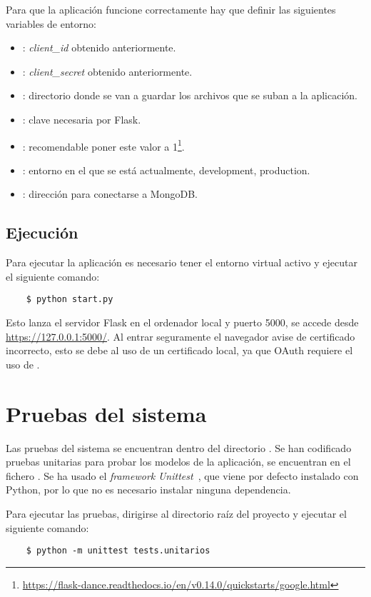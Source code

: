 Para que la aplicación funcione correctamente hay que definir las siguientes 
variables de entorno:
\begin{itemize}
	\item {}: \textit{client\_id} obtenido 
	anteriormente.
	\item {}: \textit{client\_secret} 
	obtenido anteriormente.
	\item {}: directorio donde se van a guardar los archivos 
	que se suban a la aplicación.
	\item {}: clave necesaria por Flask.
	\item {}: recomendable poner este valor a 
	1\footnote{\url{https://flask-dance.readthedocs.io/en/v0.14.0/quickstarts/google.html}}.
	\item {}: entorno en el que se está actualmente, 
	development, production.
	\item {}: dirección para conectarse a MongoDB.
\end{itemize}

\subsection{Ejecución}

Para ejecutar la aplicación es necesario tener el entorno virtual activo y 
ejecutar el siguiente comando:
\begin{lstlisting}
	$ python start.py
\end{lstlisting}
Esto lanza el servidor Flask en el ordenador local y puerto 5000, se accede 
desde \url{https://127.0.0.1:5000/}. Al entrar seguramente el navegador avise 
de certificado incorrecto, esto se debe al uso de un certificado local, ya que 
OAuth requiere el uso de .

\section{Pruebas del sistema}

Las pruebas del sistema se encuentran dentro del directorio . Se 
han codificado pruebas unitarias para probar los modelos de la aplicación, se 
encuentran en el fichero . Se ha usado el \textit{framework} 
\textit{Unittest}~\cite{unittest}, que viene por defecto instalado con Python, 
por lo que no es necesario instalar ninguna dependencia.

Para ejecutar las pruebas, dirigirse al directorio raíz del proyecto y ejecutar 
el siguiente comando:
\begin{lstlisting}
	$ python -m unittest tests.unitarios
\end{lstlisting}